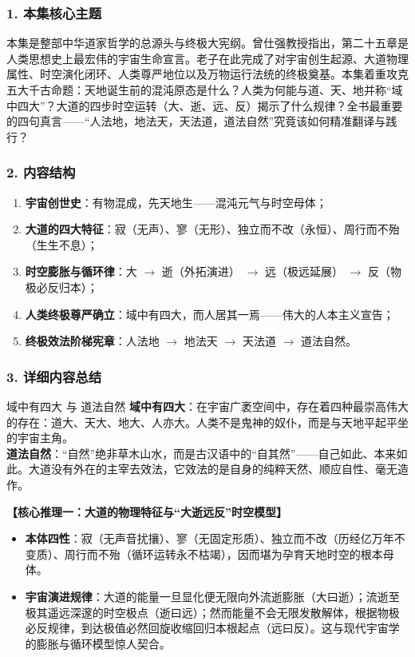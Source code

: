 \subsubsection{1. 本集核心主题}
本集是整部中华道家哲学的总源头与终极大宪纲。曾仕强教授指出，第二十五章是人类思想史上最宏伟的宇宙生命宣言。老子在此完成了对宇宙创生起源、大道物理属性、时空演化闭环、人类尊严地位以及万物运行法统的终极奠基。本集着重攻克五大千古命题：天地诞生前的混沌原态是什么？人类为何能与道、天、地并称“域中四大”？大道的四步时空运转（大、逝、远、反）揭示了什么规律？全书最重要的四句真言——“人法地，地法天，天法道，道法自然”究竟该如何精准翻译与践行？

\subsubsection{2. 内容结构}
\begin{enumerate}
    \item \textbf{宇宙创世史}：有物混成，先天地生——混沌元气与时空母体；
    \item \textbf{大道的四大特征}：寂（无声）、寥（无形）、独立而不改（永恒）、周行而不殆（生生不息）；
    \item \textbf{时空膨胀与循环律}：大 $\rightarrow$ 逝（外拓演进） $\rightarrow$ 远（极远延展） $\rightarrow$ 反（物极必反归本）；
    \item \textbf{人类终极尊严确立}：域中有四大，而人居其一焉——伟大的人本主义宣告；
    \item \textbf{终极效法阶梯宪章}：人法地 $\rightarrow$ 地法天 $\rightarrow$ 天法道 $\rightarrow$ 道法自然。
\end{enumerate}

\subsubsection{3. 详细内容总结}

\begin{ConceptBox}{域中有四大 与 道法自然}
\textbf{域中有四大}：在宇宙广袤空间中，存在着四种最崇高伟大的存在：道大、天大、地大、人亦大。人类不是鬼神的奴仆，而是与天地平起平坐的宇宙主角。\\
\textbf{道法自然}：“自然”绝非草木山水，而是古汉语中的“自其然”——自己如此、本来如此。大道没有外在的主宰去效法，它效法的是自身的纯粹天然、顺应自性、毫无造作。
\end{ConceptBox}

\noindent\textbf{【核心推理一：大道的物理特征与“大逝远反”时空模型】}
\begin{itemize}
    \item \textbf{本体四性}：寂（无声音扰攘）、寥（无固定形质）、独立而不改（历经亿万年不变质）、周行而不殆（循环运转永不枯竭），因而堪为孕育天地时空的根本母体。
    \item \textbf{宇宙演进规律}：大道的能量一旦显化便无限向外流逝膨胀（大曰逝）；流逝至极其遥远深邃的时空极点（逝曰远）；然而能量不会无限发散解体，根据物极必反规律，到达极值必然回旋收缩回归本根起点（远曰反）。这与现代宇宙学的膨胀与循环模型惊人契合。
\end{itemize}


